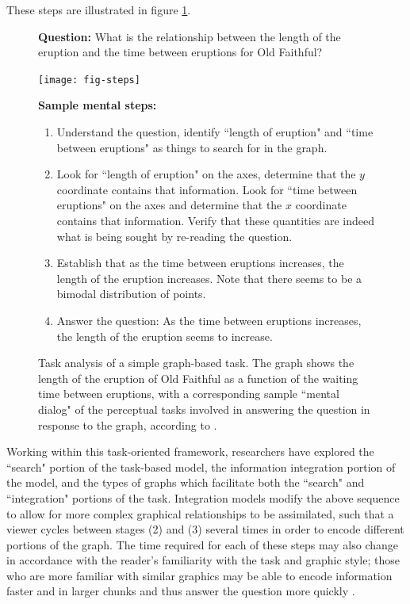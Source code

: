 \documentclass[11pt]{isuthesis}\usepackage[]{graphicx}\usepackage[]{color}
\begin{document}
These steps are illustrated in figure \ref{fig:taskgraph}. 


\begin{figure}[htbp]
\textbf{Question:} What is the relationship between the length of the eruption and the time between eruptions for Old Faithful?
\begin{center}
\begin{minipage}[c]{.45\linewidth}
\texttt{[image: fig-steps]}
\end{minipage}
\begin{minipage}[c]{.54\linewidth}
\textbf{Sample mental steps: }
{\small
\begin{enumerate}
\item Understand the question, identify ``length of eruption" and ``time between eruptions" as things to search for in the graph.
\item Look for ``length of eruption" on the axes, determine that the $y$ coordinate contains that information. Look for ``time between eruptions" on the axes and determine that the $x$ coordinate contains that information. Verify that these quantities are indeed what is being sought by re-reading the question. 
\item Establish that as the time between eruptions increases, the length of the eruption increases. Note that there seems to be a bimodal distribution of points. 
\item Answer the question: As the time between eruptions increases, the length of the eruption seems to increase.
\end{enumerate}
}
\end{minipage}
\end{center}
\caption[Task analysis of a simple graph]{Task analysis of a simple graph-based task. The graph shows the length of the eruption of Old Faithful as a function of the waiting time between eruptions, with a corresponding sample ``mental dialog" of the perceptual tasks involved in answering the question in response to the graph, according to \protect\citet{shah2005cambridge}. }\label{fig:taskgraph}
\end{figure}

Working within this task-oriented framework, researchers have explored the ``search" portion of the task-based model, the information integration portion of the model, and the types of graphs which facilitate both the ``search" and ``integration" portions of the task. Integration models modify the above sequence to allow for more complex graphical relationships to be assimilated, such that a viewer cycles between stages (2) and (3) several times in order to encode different portions of the graph. The time required for each of these steps may also change in accordance with the reader's familiarity with the task and graphic style; those who are more familiar with similar graphics may be able to encode information faster and in larger chunks and thus answer the question more quickly \citep{carpenter1998model}. 
\end{document}
